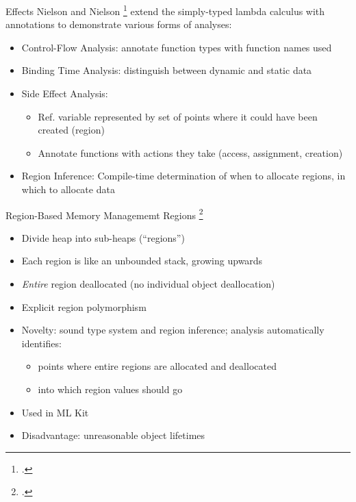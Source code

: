 \documentclass[aspectratio=169]{beamer}
\begin{document}
\begin{frame}{Effects}
    Nielson and Nielson \footcite{nielson_type_1999} extend the simply-typed lambda calculus with annotations to demonstrate various forms of analyses:
    \begin{itemize}[<+->]
        \item Control-Flow Analysis: annotate function types with function names used
        \item Binding Time Analysis: distinguish between dynamic and static data
        \item Side Effect Analysis:
            \begin{itemize}
                \item Ref. variable represented by set of points where it could have been created (\alert{region})
                \item Annotate functions with actions they take (access, assignment, creation)
            \end{itemize}
        \item \alert{Region} Inference: Compile-time determination of when to allocate regions, in which to allocate data
    \end{itemize}
\end{frame}


\begin{frame}{Region-Based Memory Managememt}
    Regions \footcite{tofte_region-based_1997}
    \begin{itemize}
        \item Divide heap into sub-heaps (``regions'')
        \item Each region is like an unbounded stack, growing upwards
        \item \emph{Entire} region deallocated (no individual object deallocation)
        \item Explicit region polymorphism %
        \item Novelty: sound type system and region inference; analysis automatically identifies:
            \vspace{-0.2in}
            \begin{itemize}
                \item points where entire regions are allocated and deallocated
                \item into which region values should go
            \end{itemize}
        \item Used in ML Kit
        \item Disadvantage: unreasonable object lifetimes %
    \end{itemize}
    \vspace{0.1in}
\end{frame}
\end{document}
